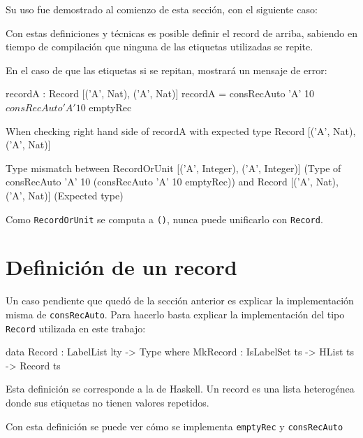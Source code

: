 Su uso fue demostrado al comienzo de esta sección, con el siguiente caso:


Con estas definiciones y técnicas es posible definir el record de arriba, sabiendo en tiempo de compilación que ninguna de las etiquetas utilizadas se repite.

En el caso de que las etiquetas si se repitan, mostrará un mensaje de error:

\begin{code}
recordA : Record [('A', Nat), ('A', Nat)]
recordA = consRecAuto 'A' 10 $ consRecAuto 'A' 10 $ emptyRec

When checking right hand side of recordA with expected type
             Record [('A', Nat), ('A', Nat)]
     
     Type mismatch between
             RecordOrUnit [('A', Integer), ('A', Integer)] 
               (Type of consRecAuto 'A' 10
                 (consRecAuto 'A' 10 emptyRec))
     and
             Record [('A', Nat), ('A', Nat)] (Expected type)
\end{code}

Como \texttt{RecordOrUnit} se computa a \texttt{()}, nunca puede unificarlo con \texttt{Record}.

\section{Definición de un record}

Un caso pendiente que quedó de la sección anterior es explicar la implementación misma de \texttt{consRecAuto}. Para hacerlo basta explicar la implementación del tipo \texttt{Record} utilizada en este trabajo:

\begin{code}
data Record : LabelList lty -> Type where
    MkRecord : IsLabelSet ts -> HList ts -> Record ts
\end{code}

Esta definición se corresponde a la de Haskell. Un record es una lista heterogénea donde sus etiquetas no tienen valores repetidos.

Con esta definición se puede ver cómo se implementa \texttt{emptyRec} y \texttt{consRecAuto}

